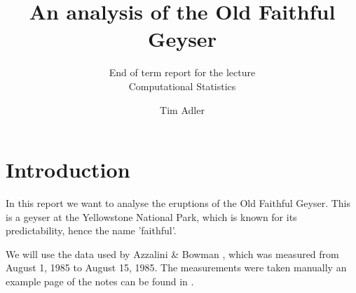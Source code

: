 \documentclass[english,final]{scrartcl}
\title{An analysis of the Old Faithful Geyser}
\subtitle{End of term report for the lecture\\Computational Statistics}
\author{Tim Adler}
\begin{document}


\maketitle

















\section{Introduction}
\label{sec:introduction}

In this report we want to analyse the eruptions of the Old Faithful Geyser. This is a geyser at the Yellowstone National Park, which is known for its predictability, hence the name 'faithful'.

We will use the data used by Azzalini \& Bowman \cite{data}, which was measured from August 1, 1985 to August 15, 1985. The measurements were taken manually an example page of the notes can be found in \cite[2]{data}. 
\end{document}
